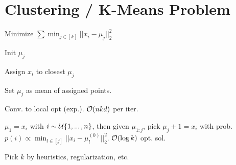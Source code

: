 \section{Clustering / K-Means Problem}
\begin{definition}[Problem.]
  Minimize \(\sum \min_{j \in [k]} ||x_i - \mu_j||_2^2\)
\end{definition}

\begin{definition}
  \begin{enumerate*}
    \item Init \(\mu_j\)
    \item Assign \(x_i\) to closest \(\mu_j\)
    \item Set \(\mu_j\) as mean of assigned points.
  \end{enumerate*}
\end{definition}

Conv. to local opt (exp.). \(\mathcal{O}(nkd)\) per iter. 

\begin{definition}[K-Means++]
  \(\mu_1 = x_i\) with \(i \sim \unif\{1, \sdots, n\}\), then given \(\mu_{1:j}\), pick \(\mu_j+1 = x_i\) with prob. \(p(i) \propto \min_{l \in [j]} ||x_i - \mu_l^{(0)}||_2^2\).
  \(\mathcal{O}(\log k)\) opt. sol.
\end{definition}

Pick \(k\) by heuristics, regularization, etc.
